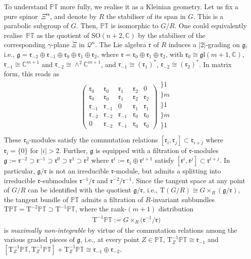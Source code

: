 \documentclass[pdftex]{sigma}
\numberwithin{equation}{section}
\newcommand{\mc} [1]{\mathcal{#1}}
\newcommand{\SO} {\mathrm{SO}}
\newcommand{\Tgt} {\mathrm{T}}
\newcommand{\glie} {\mathfrak{gl}}
\newcommand{\g} {\mathfrak{g}}
\newcommand{\mfr} {\mathfrak{r}}
\newcommand{\PT} {\mathbb{PT}}
\newcommand{\C} {\mathbb{C}}
\begin{document}
To understand $\PT$ more fully, we realise it as a Kleinian geometry. Let us f\/ix a pure spinor~$\Xi^{\bm{\upalpha}}$, and denote by $R$ the stabiliser of its span in $G$. This is a parabolic subgroup of $G$. Then, $\PT$ is isomorphic to $G/R$. One could equivalently realise~$\PT$ as the quotient of $\SO(n+2,\C)$ by the stabiliser of the corresponding $\gamma$-plane $\check{\Xi}$ in $\mc{Q}^n$. The Lie algebra $\mfr$ of $R$ induces a $|2|$-grading on $\g$, i.e., $\g = \mfr_{-2} \oplus \mfr_{-1} \oplus \mfr_0 \oplus \mfr_1 \oplus \mfr_2$, where $\mfr = \mfr_0 \oplus \mfr_1 \oplus \mfr_2$, with $\mfr_0 \cong \glie(m+1,\C)$, $\mfr_{-1} \cong \C^{m+1}$ and $\mfr_{-2} \cong \wedge^2 \C^{m+1}$, and $\mfr_{-1} \cong (\mfr_1)^*$, $\mfr_{-2} \cong (\mfr_2)^*$. In matrix form, this reads as
\begin{gather*}
\left(
 \begin{array}{c|c|c|c|c}
\mfr_0 & \mfr_0 & \mfr_1 & \mfr_2 & 0 \\\hline 
\mfr_0 & \mfr_0 & \mfr_1 & \mfr_2 & \mfr_2 \\\hline 
\mfr_{-1} & \mfr_{-1} & 0 & \mfr_1 & \mfr_1 \\\hline 
\mfr_{-2} & \mfr_{-2} & \mfr_{-1} & \mfr_0 & \mfr_0 \\\hline 
0 & \mfr_{-2} & \mfr_{-1} & \mfr_0 & \mfr_0
\end{array} \right)
\begin{array}{l}
\} \scriptscriptstyle{1} \\ \} \scriptscriptstyle{m} \\ \} \scriptscriptstyle{1} \\ \} \scriptscriptstyle{m} \\ \} \scriptscriptstyle{1} \\
\end{array}
\end{gather*}
These $\mfr_0$-modules satisfy the commutation relations $[\mfr_i,\mfr_j]\subset \mfr_{i+j}$ where $\mfr_i=\{ 0 \}$ for $|i|>2$. Further, $\g$ is equipped with a f\/iltration of $\mfr$-modules $\g := \mfr^{-2} \supset \mfr^{-1} \supset \mfr^0 \supset \mfr^1 \supset \mfr^2$ where $\mfr^i := \mfr_i \oplus \mfr^{i+1}$ satisfy $[\mfr^i , \mfr^j] \subset \mfr^{i+j}$. In particular, $\g/\mfr$ is not an irreducible $\mfr$-module, but admits a splitting into irreducible $\mfr$-submodules $\mfr^{-1} /\mfr$ and $\mfr^{-2} /\mfr^{-1}$. Since the tangent space at any point of $G/R$ can be identif\/ied with the quotient $\g/\mfr$, i.e., $\Tgt ( G/R ) \cong G \times_R \left( \g/\mfr \right)$, the tangent bundle of $\PT$ admits a f\/iltration of $R$-invariant subbundles $\Tgt \PT = \Tgt^{-2} \PT \supset \Tgt^{-1} \PT$, where the rank-$(m+1)$ distribution
\begin{gather}\label{eq-D}
 \Tgt^{-1} \PT := G \times_R \big( \mfr^{-1}/\mfr \big)
\end{gather}
is \emph{maximally non-integrable} by virtue of the commutation relations among the various graded pieces of $\g$, i.e., at every point $Z \in \PT$, $ \Tgt^{-1}_Z \PT \cong \mfr_{-1}$ and $[ \Tgt^{-1}_Z \PT , \Tgt^{-1}_Z \PT ] + \Tgt^{-1}_Z \PT \cong \mfr_{-1} \oplus \mfr_{-2}$.
\end{document}
